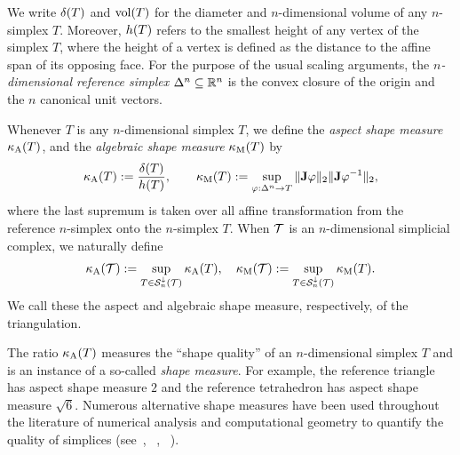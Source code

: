 \documentclass[10pt,a4paper]{article}
\begin{document}
We write ${\delta}(T)$ and $\operatorname{vol}(T)$ for the diameter and $n$-dimensional volume of any $n$-simplex $T$.
Moreover, $h(T)$ refers to the smallest height of any vertex of the simplex $T$,
where the height of a vertex is defined as the distance to the affine span of its opposing face.
For the purpose of the usual scaling arguments, the \emph{$n$-dimensional reference simplex} $\Delta^n \subseteq {\mathbb R}^n$ is the convex closure of the origin and the $n$ canonical unit vectors. 



Whenever $T$ is any $n$-dimensional simplex $T$,
we define the \emph{aspect shape measure} $\kappa_{\rm A}(T)$,
and 
the \emph{algebraic shape measure} $\kappa_{\rm M}(T)$
by 
\begin{align}\label{math:shapemeasure}
    \kappa_{\rm A}(T)
    := 
    \frac{ {\delta}(T) }{ h(T) }
    ,
    \qquad 
    \kappa_{\rm M}(T)
    := 
    \sup_{ \varphi : \Delta^n \rightarrow T } 
    \| {\mathbf{J}} \varphi \|_{2} \|  {\mathbf{J}} \varphi^{-1}  \|_{2}
    ,
\end{align}
where the last supremum is taken over all affine transformation from the reference $n$-simplex onto the $n$-simplex $T$. 
When ${\mathcal T}$ is an $n$-dimensional simplicial complex, we naturally define 
\begin{align}\label{math:shapemeasure:triangulation}
    \kappa_{\rm A}({\mathcal T}) := \sup_{ T \in {\mathcal S}^{\downarrow}_{n}({\mathcal T}) } \kappa_{\rm A}(T)
    ,
    \quad 
    \kappa_{\rm M}({\mathcal T}) := \sup_{ T \in {\mathcal S}^{\downarrow}_{n}({\mathcal T}) } \kappa_{\rm M}(T)
    .
\end{align}
We call these the aspect and algebraic shape measure, respectively, of the triangulation. 

\begin{remark}
    The ratio $\kappa_{\rm A}(T)$ measures the ``shape quality'' of an $n$-dimensional simplex $T$ and is an instance of a so-called \emph{shape measure}.
    For example, the reference triangle has aspect shape measure $2$ and the reference tetrahedron has aspect shape measure $\sqrt{6}$. 
    Numerous alternative shape measures have been used throughout the literature of numerical analysis and computational geometry to quantify the quality of simplices (see~\cite[p.61, Definition 5.1]{braess2001finite}, 
   ~\cite[p.97, Definition {\char`\(}4.2.16{\char`\)} ]{brenner2008mathematical}, %
   ~\cite[Definition~11.2]{ern2021finite}). 
\end{remark}
\end{document}

